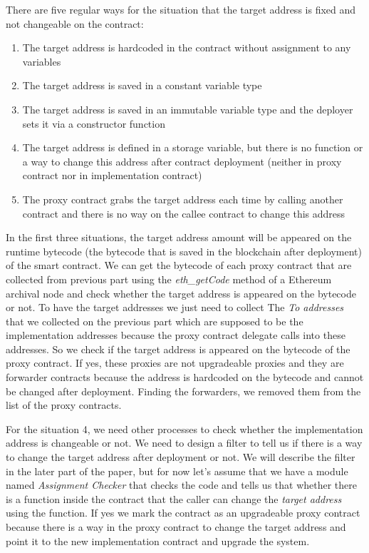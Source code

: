 There are five regular ways for the situation that the target address is fixed and not changeable on the contract:
\begin{enumerate}
  \item The target address is hardcoded in the contract without assignment to any variables
  \item The target address is saved in a constant variable type 
  \item The target address is saved in an immutable variable type and the deployer sets it via a constructor function
  \item The target address is defined in a storage variable, but there is no function or a way to change this address after contract deployment (neither in proxy contract nor in implementation contract)
  \item The proxy contract grabs the target address each time by calling another contract and there is no way on the callee contract to change this address
\end{enumerate} 

In the first three situations, the target address amount will be appeared on the runtime bytecode (the bytecode that is saved in the blockchain after deployment) of the smart contract. We can get the bytecode of each proxy contract that are collected from previous part using the \textit{eth\_getCode} method of a Ethereum archival node and check whether the target address is appeared on the bytecode or not. To have the target addresses we just need to collect The \textit{To addresses} that we collected on the previous part which are supposed to be the implementation addresses because the proxy contract delegate calls into these addresses. So we check if the target address is appeared on the bytecode of the proxy contract. If yes, these proxies are not upgradeable proxies and they are forwarder contracts because the address is hardcoded on the bytecode and cannot be changed after deployment. Finding the forwarders, we removed them from the list of the proxy contracts.

For the situation 4, we need other processes to check whether the implementation address is changeable or not. We need to design a filter to tell us if there is a way to change the target address after deployment or not. We will describe the filter in the later part of the paper, but for now let's assume that we have a module named \textit{Assignment Checker} that checks the code and tells us that whether there is a function inside the contract that the caller can change the \textit{target address} using the function. If yes we mark the contract as an upgradeable proxy contract because there is a way in the proxy contract to change the target address and point it to the new implementation contract and upgrade the system.

